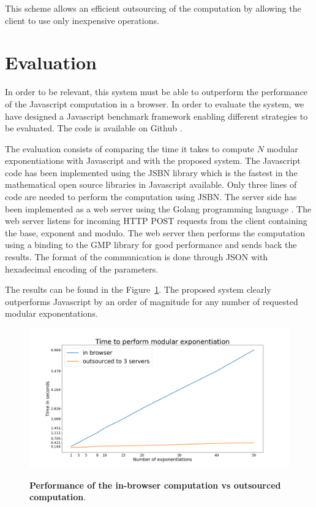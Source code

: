 \documentclass[]{article}
\begin{document}
This scheme allows an efficient outsourcing of the computation by allowing the
client to use only inexpensive operations.

\section{Evaluation} \label{evaluation}

In order to be relevant, this system must be able to outperform the performance
of the Javascript computation in a browser. In order to evaluate the system, we
have designed a Javascript benchmark framework enabling different strategies to be
evaluated. The code is available on Github \cite{code}.

The evaluation consists of comparing the time it takes to compute $N$ modular
exponentiations with Javascript and with the proposed system. The Javascript
code has been implemented using the JSBN library \cite{jsbn} which is the
fastest in the mathematical open source libraries in Javascript available. Only
three lines of code are needed to perform the computation using JSBN.  The
server side has been implemented as a web server using the Golang programming
language \cite{golang}. The web server listens
for incoming HTTP POST requests from the client containing the base, exponent and modulo. 
The web server then performs the computation using a binding to the GMP library
\cite{gmplib} for good performance and sends back the results. The format of the
communication is done through JSON with hexadecimal encoding of the parameters. 

The results can be found in the Figure~\ref{fig:system}. The proposed system clearly
outperforms Javascript by an order of magnitude for any number of requested
modular exponentations.

\begin{figure}[!htb]
    \begin{center}
        \label{fig:system}
        \includegraphics[scale=0.25]{local_vs_split_50.png}
        \caption{\textbf{Performance of the in-browser computation vs
        outsourced computation}.}
    \end{center}
\end{figure}
\end{document}
